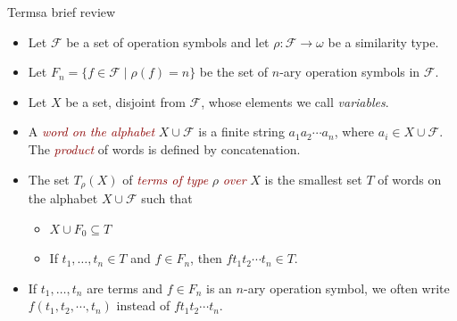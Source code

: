 \documentclass[xcolor=dvipsnames,9pt,hide notes,mathserif]{beamer}
\renewcommand{\alert}[1]{\textcolor{darkred}{\emph{#1}}}
\newcommand{\sF}{\ensuremath{\mathcal{F}}}
\theoremstyle{definition}
\theoremstyle{remark}
\numberwithin{theorem}{section}
\numberwithin{claim}{section}
\numberwithin{equation}{section}
\numberwithin{conjecture}{section}
\newcommand{\<}{\ensuremath{\langle}}
\renewcommand{\>}{\ensuremath{\rangle}}
\begin{document}
\newcommand{\bT}{\ensuremath{\mathbf{T}}}
\newcommand{\TX}{\ensuremath{T_\rho(X)}}
\newcommand{\TXn}{\ensuremath{T_\rho(X_n)}}
\newcommand{\bTX}{\ensuremath{\bT_{\rho}(X)}}
\newcommand{\bTXn}{\ensuremath{\bT_{\rho}(X_n)}}
\newcommand{\salg}{\ensuremath{\mathscr{A}_{\rho}}}
\begin{frame}[label=Terms]{Terms}{a brief review}
  \begin{itemize}
  \item<1->
 Let $\sF$ be a set of operation symbols and let 
$\rho : \sF \rightarrow \omega$
be a similarity type.

\vskip3mm

\item<1->
Let $F_n = \{ f\in \sF \mid \rho(f) = n\}$
  be the set of $n$-ary operation symbols in $\sF$.

\vskip3mm

\item<2-> Let $X$ be a set, disjoint from $\sF$, whose elements we call
  \emph{variables}.  

\vskip3mm

\item<2->
A \alert{word on the alphabet}
  $X\cup \sF$ is a finite string $a_1a_2\cdots a_{n}$, where $a_i\in X\cup \sF$. 
The \alert{product} of words is defined by concatenation.

\vskip3mm

\item<3-> The set $T_\rho(X)$ of \alert{terms of type} $\rho$ \alert{over} $X$
  is the smallest set $T$ of  words on the alphabet $X\cup \sF$ such that 
  \begin{itemize}
  \item $X\cup F_0 \subseteq T$
  \item If $t_1, \dots, t_{n} \in T$ and $f\in F_n$, then 
    $ft_1t_2\cdots t_{n} \in T$.
  \end{itemize}

\vskip3mm

  \item<3-> If $t_1, \dots, t_{n}$ are terms and $f\in F_n$ is an $n$-ary
    operation symbol, we often write $f(t_1,t_2,\cdots, t_{n})$ instead
    of $ft_1t_2\cdots t_{n}$.


\end{itemize}
\end{frame}
\end{document}
